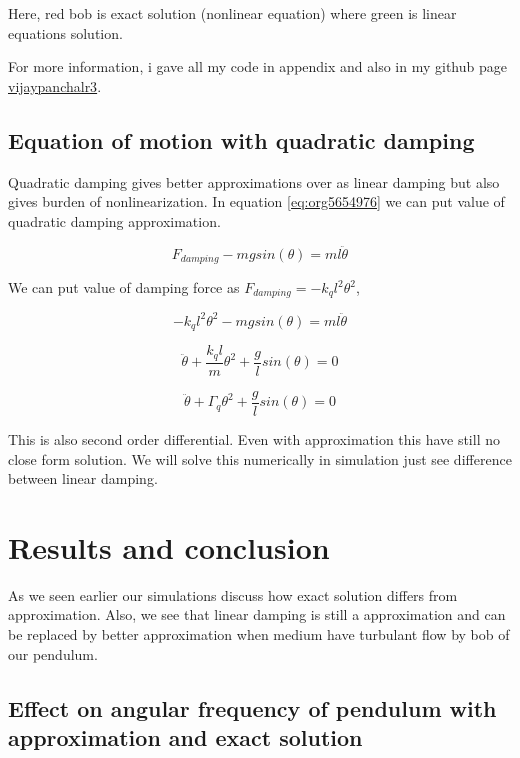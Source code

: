 \documentclass[11pt,a4paper]{article}
\begin{document}
Here, red bob is exact solution (nonlinear equation) where green is linear equations solution.

For more information, i gave all my code in appendix and also in my github page \href{https://github.com/vijaypanchalr3}{vijaypanchalr3}.

\subsection{Equation of motion with quadratic damping}
\label{sec:orgd6a1820}

Quadratic damping gives better approximations over as linear damping but also gives burden of nonlinearization. In equation \ref{eq:org5654976} we can put value of quadratic damping approximation. 

\begin{equation*}
F_{damping}-mgsin(\theta)=ml\ddot{\theta}
\end{equation*}

We can put value of damping force as \(F_{damping} = -k_{q}l^{2}\theta^{2}\),

\begin{equation*}
-k_{q}l^{2}\theta^{2}-mgsin(\theta)=ml\ddot{\theta}
\end{equation*}

\begin{equation*}
\ddot{\theta}+\frac{k_{q}l}{m}\theta^{2}+\frac{g}{l}sin(\theta)=0
\end{equation*}

\begin{equation*}
\ddot{\theta}+\Gamma_{q}\theta^{2}+\frac{g}{l}sin(\theta)=0
\end{equation*}

This is also second order differential. Even with approximation this have still no close form solution. We will solve this numerically in simulation just see difference between linear damping.

\section{Results and conclusion}
\label{sec:org1c33cb8}

As we seen earlier our simulations discuss how exact solution differs from approximation. Also, we see that linear damping is still a approximation and can be replaced by better approximation when medium have turbulant flow by bob of our pendulum.

\subsection{Effect on angular frequency of pendulum with approximation and exact solution}
\label{sec:org80e3fa5}
\end{document}
